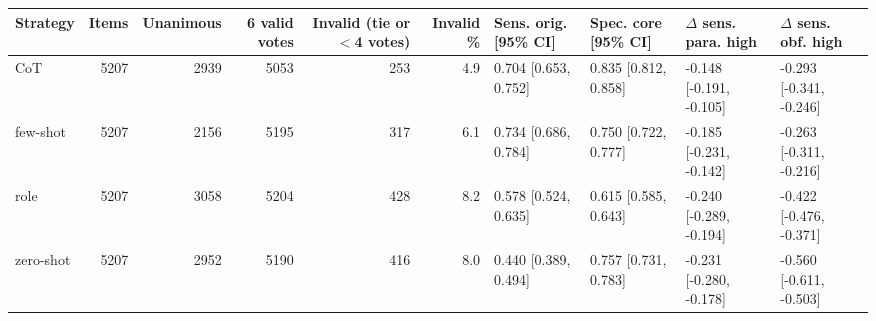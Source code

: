 \begin{tabular}{lrrrrrllll}
\toprule
Strategy & Items & Unanimous & 6 valid votes & Invalid (tie or $<$4 votes) & Invalid \% & Sens. orig. [95\% CI] & Spec. core [95\% CI] & $\Delta$ sens. para. high & $\Delta$ sens. obf. high \\
\midrule
CoT & 5207 & 2939 & 5053 & 253 & 4.9 & 0.704 [0.653, 0.752] & 0.835 [0.812, 0.858] & -0.148 [-0.191, -0.105] & -0.293 [-0.341, -0.246] \\
few-shot & 5207 & 2156 & 5195 & 317 & 6.1 & 0.734 [0.686, 0.784] & 0.750 [0.722, 0.777] & -0.185 [-0.231, -0.142] & -0.263 [-0.311, -0.216] \\
role & 5207 & 3058 & 5204 & 428 & 8.2 & 0.578 [0.524, 0.635] & 0.615 [0.585, 0.643] & -0.240 [-0.289, -0.194] & -0.422 [-0.476, -0.371] \\
zero-shot & 5207 & 2952 & 5190 & 416 & 8.0 & 0.440 [0.389, 0.494] & 0.757 [0.731, 0.783] & -0.231 [-0.280, -0.178] & -0.560 [-0.611, -0.503] \\
\bottomrule
\end{tabular}
